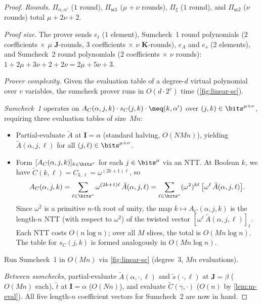 \begin{proof}
\emph{Rounds.}
$\Pi_{\alpha,\alpha'}$ ($1$ round), $\Pi_{\mathsf{sc1}}$ ($\mu+\nu$ rounds), $\Pi_\xi$ ($1$ round), and $\Pi_{\mathsf{sc2}}$ ($\nu$ rounds) total $\mu + 2\nu + 2$.

\emph{Proof size.}
The prover sends $e_t$ ($1$ element), Sumcheck~1 round polynomials ($2$ coefficients $\times$ $\mu$ $\bm{J}$-rounds, $3$ coefficients $\times$ $\nu$ $\bm{K}$-rounds), $e_A$ and $e_s$ ($2$ elements), and Sumcheck~2 round polynomials ($2$ coefficients $\times$ $\nu$ rounds): $1 + 2\mu + 3\nu + 2 + 2\nu = 2\mu + 5\nu + 3$.

\emph{Prover complexity.}
Given the evaluation table of a degree-$d$ virtual polynomial over $v$ variables,
the sumcheck prover runs in $O(d \cdot 2^v)$ time (\cref{fig:linear-sc}).

\emph{Sumcheck~1} operates on $A_C(\alpha, j, k) \cdot s_C(j, k) \cdot \meq(k, \alpha')$ over $(j,k) \in \bits^{\mu+\nu}$, requiring three evaluation tables of size~$Mn$:
\begin{itemize}[nosep]
    \item Partial-evaluate $\tilde{A}$ at $\bm{I} = \alpha$
          (standard halving, $O(NMn)$), yielding $\tilde{A}(\alpha, j, \ell)$
          for all $(j,\ell) \in \bits^{\mu+\nu}$.
    \item Form $[A_C(\alpha,j,k)]_{k \in \bits^\nu}$ for each $j \in \bits^\mu$ via an NTT.
          At Boolean $k$, we have $\tilde{C}(k,\ell) = C_{k,\ell} = \omega^{(2k+1)\ell}$, so
          \[
              A_C(\alpha,j,k) = \sum_{\ell\in\bits^\nu} \omega^{(2k+1)\ell}\,\tilde{A}(\alpha,j,\ell)
              = \sum_{\ell\in\bits^\nu} (\omega^2)^{k\ell}\,\bigl[\omega^{\ell}\,\tilde{A}(\alpha,j,\ell)\bigr].
          \]
          Since $\omega^2$ is a primitive $n$-th root of unity, the map $k \mapsto A_C(\alpha,j,k)$ is the length-$n$ NTT (with respect to $\omega^2$) of the twisted vector $[\omega^\ell\,\tilde{A}(\alpha,j,\ell)]_{\ell}$.
          Each NTT costs $O(n\log n)$; over all $M$ slices, the total is $O(Mn\log n)$.
          The table for $s_C(j,k)$ is formed analogously in $O(Mn\log n)$.
\end{itemize}
Run Sumcheck~1 in $O(Mn)$ via \cref{fig:linear-sc} (degree~$3$, $Mn$ evaluations).

\emph{Between sumchecks,} partial-evaluate
$\tilde{A}(\alpha,\cdot,\ell)$ and $\tilde{s}(\cdot,\ell)$
at $\bm{J}=\beta$ ($O(Mn)$ each),
$\tilde{t}$ at $\bm{I}=\alpha$ ($O(Nn)$),
and evaluate $\tilde{C}(\gamma,\cdot)$ ($O(n)$ by \cref{lem:m-eval}).
All five length-$n$ coefficient vectors for Sumcheck~2 are now in hand.


\end{proof}
